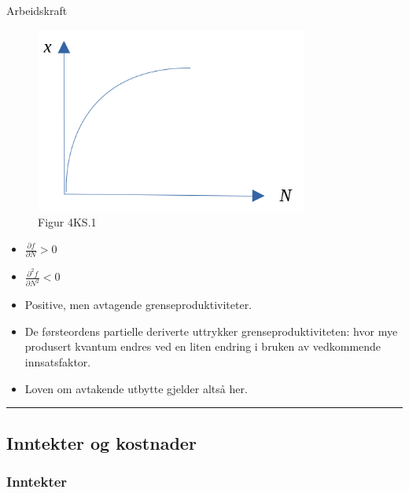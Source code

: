 \documentclass[
  letterpaper,
  DIV=11,
  numbers=noendperiod]{scrartcl}
\providecommand{\tightlist}{%
  \setlength{\itemsep}{0pt}\setlength{\parskip}{0pt}}\usepackage{longtable,booktabs,array}
\begin{document}
Arbeidskraft

\begin{figure}[H]

{\centering \includegraphics[width=0.8\textwidth,height=\textheight]{drawio/prodkl.png}

}

\caption{Figur 4KS.1}

\end{figure}%

\begin{itemize}
\tightlist
\item
  \(\frac{\partial f}{\partial N} > 0\)
\item
  \(\frac{\partial^2 f}{\partial N^2} < 0\)
\end{itemize}

\begin{itemize}
\tightlist
\item
  Positive, men avtagende grenseproduktiviteter.
\item
  De førsteordens partielle deriverte uttrykker grenseproduktiviteten:
  hvor mye produsert kvantum endres ved en liten endring i bruken av
  vedkommende innsatsfaktor.
\item
  Loven om avtakende utbytte gjelder altså her.
\end{itemize}

\begin{center}\rule{0.5\linewidth}{0.5pt}\end{center}

\subsection{Inntekter og kostnader}\label{inntekter-og-kostnader}

\subsubsection{Inntekter}\label{inntekter}
\end{document}

